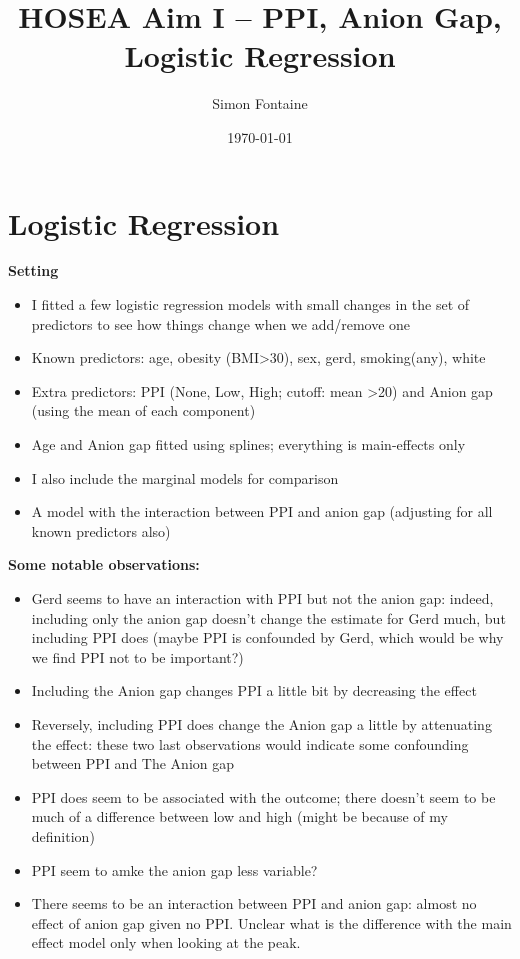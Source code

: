 \documentclass[english]{article}
\title{HOSEA Aim I -- PPI, Anion Gap, Logistic Regression}
\author{Simon Fontaine}
\date{\today}
\begin{document}
\maketitle
\tableofcontents

\newpage
\clearpage
\section{Logistic Regression}

\textbf{Setting}
\begin{itemize}
\item I fitted a few logistic regression models with small changes in the
set of predictors to see how things change when we add/remove one
\item Known predictors: age, obesity (BMI>30), sex, gerd, smoking(any), white
\item Extra predictors: PPI (None, Low, High; cutoff: mean >20) and Anion gap (using the
mean of each component)
\item Age and Anion gap fitted using splines; everything is main-effects only
\item I also include the marginal models for comparison
\item A model with the interaction between PPI and anion gap (adjusting for all known
predictors also)
\end{itemize}
\textbf{Some notable observations:}
\begin{itemize}
\item Gerd seems to have an interaction with PPI but not the anion gap: indeed, including
only the anion gap doesn't change the estimate for Gerd much, but including PPI does
(maybe PPI is confounded by Gerd, which would be why we find PPI not to be important?)
\item Including the Anion gap changes PPI a little bit by decreasing the effect
\item Reversely, including PPI does change the Anion gap a little by attenuating the effect:
these two last observations would indicate some confounding between PPI and The Anion gap
\item PPI does seem to be associated with the outcome; there doesn't seem to be much of a difference between low and high (might be because of my definition)
\item PPI seem to amke the anion gap less variable?
\item There seems to be an interaction between PPI and anion gap: almost no effect of anion gap given no PPI. Unclear what is the difference with the main effect model only when looking at the peak.
\end{itemize}
\end{document}

